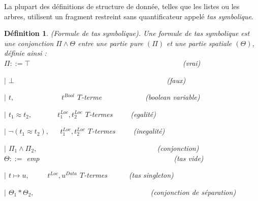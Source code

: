 \documentclass[11pt,openany]{article}
\newtheorem{definition}{D\'efinition}[subsection]
\begin{document}
	La plupart des d\'efinitions de structure de donn\'ee, telles que les listes ou les arbres, utilisent un fragment restreint sans quantificateur appel\'e \textit{tas symbolique}.
\begin{definition}
(Formule de tas symbolique). Une formule de \textit{tas symbolique} est une conjonction $\Pi\land\Theta$ entre une partie pure $(\Pi)$ et une partie spatiale $(\Theta)$, d\'efinie ainsi :\\
$\Pi ::= \top$~~~~~~~~~~~~~~~~~~~~~~~~~~~~~~~~~~~~~~~~~~(vrai)\par
$|$ $\bot$~~~~~~~~~~~~~~~~~~~~~~~~~~~~~~~~~~~~~~~~~~(faux)\par
$|$ $t,$~~~~~~~~~~~~~$t^{Bool}$ $T$-terme~~~~~~~~~~~~(boolean variable)\par
$|$ $t_{1}\approx t_{2},$~~~~~~~$t^{Loc}_{1},t^{Loc}_{2}$ $T$-termes~~~~~(egalit\'e)\par
$|$ $\neg(t_{1}\approx t_{2}),$~~~$t^{Loc}_{1},t^{Loc}_{2}$ $T$-termes~~~~~(inegalit\'e)\par
$|$ $\Pi_{1}\land\Pi_{2},$~~~~~~~~~~~~~~~~~~~~~~~~~~~~~~~~~(conjonction)\\
$\Theta ::=$ emp~~~~~~~~~~~~~~~~~~~~~~~~~~~~~~~~~~~~~(tas vide)\par
$|$ $t\mapsto u,$~~~~~$t^{Loc},u^{Data}$ $T$-termes~~~~~~(tas singleton)\par
$|$ $\Theta_{1}*\Theta_{2},$~~~~~~~~~~~~~~~~~~~~~~~~~~~~~~~~(conjonction de s\'eparation)
\end{definition}
\end{document}

